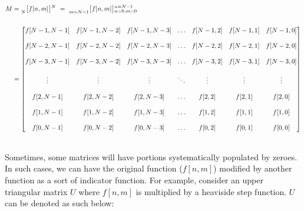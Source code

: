 \documentclass{article}
\begin{document}
\begin{align*}
    M&=   \prescript{}{N}{\begin{bmatrix} f[n, m] \end{bmatrix}}^{N} \ 
      = \ \prescript{}{m = N - 1}{\begin{bmatrix} f[n, m] \end{bmatrix}}^{n = N - 1}_{n = 0,m =0} \\ \\
     &= \begin{bmatrix}
            f[N - 1, N - 1] & f[N - 1, N - 2] & f[N - 1, N - 3] & \ldots & f[N - 1, 2] & f[N - 1, 1] & f[N - 1, 0] \\ \\
            f[N - 2, N - 1] & f[N - 2, N - 2] & f[N - 2, N - 3] & \ldots & f[N - 2, 2] & f[N - 2, 1] & f[N - 2, 0] \\ \\
            f[N - 3, N - 1] & f[N - 3, N - 2] & f[N - 3, N - 3] & \ldots & f[N - 3, 2] & f[N - 3, 1] & f[N - 3, 0] \\ \\
                     \vdots &          \vdots &          \vdots & \ddots &      \vdots &      \vdots &      \vdots \\ \\
            f[    2, N - 1] & f[    2, N - 2] & f[    2, N - 3] & \ldots & f[    2, 2] & f[    2, 1] & f[    2, 0] \\ \\
            f[    1, N - 1] & f[    1, N - 2] & f[    1, N - 3] & \ldots & f[    1, 2] & f[    1, 1] & f[    1, 0] \\ \\
            f[    0, N - 1] & f[    0, N - 2] & f[    0, N - 3] & \ldots & f[    0, 2] & f[    0, 1] & f[    0, 0]
          \end{bmatrix} \\ \\
  \end{align*} 

\newpage

Sometimes, some matrices will have portions systematically populated by zeroes. In such cases, we can have the original function ($f[n, m]$) modified by another function as a sort of indicator function. For example, consider an upper triangular matrix $U$ where $f[n, m]$ is multiplied by a heaviside step function. $U$ can be denoted as such below:
\end{document}
